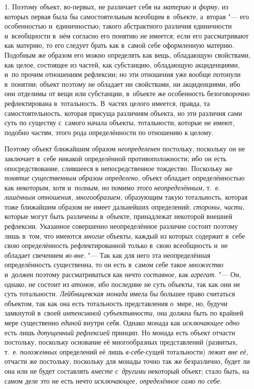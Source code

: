 1. Поэтому объект, во-первых, не различает себя на {\em материю} и
{\em форму,} из которых первая была бы самостоятельным всеобщим в~объекте,
а~вторая "--- его особенностью и~единичностью; такого абстрактного
различия единичности и~всеобщности в~нём согласно его понятию не имеется;
если его рассматривают как материю, то его следует брать как в~самой себе
оформленную материю. Подобным же образом его можно определять как вещь,
обладающую свойствами, как целое, состоящее из частей, как субстанцию,
обладающую акциденциями, и~по прочим отношениям рефлексии; но эти отношения
уже вообще потонули в~понятии; объект поэтому не обладает ни свойствами, ни
акциденциями, ибо они отделимы от вещи или субстанции, в~объекте же
особенность безоговорочно рефлектирована в~тотальность. В~частях целого
имеется, правда, та самостоятельность, которая присуща различиям объекта,
но эти различия сами суть по существу с~самого начала объекты, тотальности,
которые не имеют, подобно частям, этого рода определённости по отношению к
целому.

Поэтому объект ближайшим образом {\em неопределенен}
постольку, поскольку он не заключает в~себе никакой
определённой противоположности; ибо он есть опосредствование, слившееся в
непосредственное тождество. Поскольку же {\em понятие существенным образом
определено,} объект обладает определённостью как некоторым,
хотя и~полным, но помимо этого {\em неопределённым,}
т.~е. {\em лишённым отношения, многообразием,} образующим такую тотальность,
которая тоже ближайшим образом не имеет дальнейших определений;
{\em стороны, части,}
которые могут быть различены в~объекте, принадлежат некоторой
внешней рефлексии. Указанное совершенно неопределённое различие состоит
поэтому лишь в~том, что имеются {\em многие} объекты,
каждый из которых содержит в~себе свою определённость рефлектированной
только в~свою всеобщность и~не обладает свечением {\em во-вне}. "--- Так как
для него эта неопределённая определённость существенна, то он есть в~самом
себе такое {\em множество} и~должен поэтому рассматриваться как нечто
{\em составное,} как {\em агрегат}. "--- Он,
однако, не состоит из {\em атомов,}
ибо последние не суть объекты, так как они не суть
тотальности. {\em Лейбницевская монада}
имела бы большее право считаться объектом, так как она есть
тотальность представления о~мире, но, будучи замкнутой в~своей
{\em интенсивной субъективности,} она должна быть по крайней мере существенно
{\em единой} внутри себя. Однако монада как {\em исключающее
одно} есть лишь {\em допущенный рефлексией}
принцип. Но монада есть объект отчасти постольку, поскольку
основание её многообразных представлений (развитых, т.~е.
{\em положенных} определений её лишь {\em в-себе}-сущей
тотальности) лежит {\em вне её,}
отчасти же постольку, поскольку для монады точно так же
безразлично, будет ли она или не будет составлять {\em вместе с~другими}
некоторый объект; стало быть, на самом деле это не есть нечто
{\em исключающее, определённое само по себе}.

